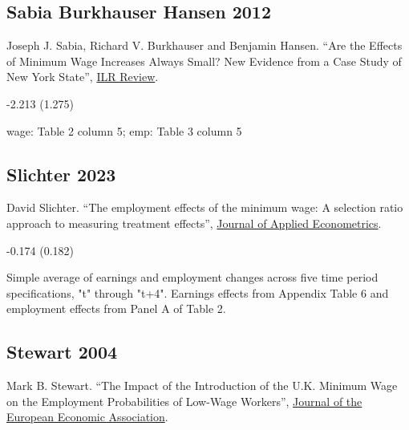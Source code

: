 \subsection*{Sabia Burkhauser Hansen 2012}
\vspace{-0.7em}

\noindent Joseph J. Sabia, Richard V. Burkhauser and Benjamin Hansen. ``Are the Effects of Minimum Wage Increases Always Small? New Evidence from a Case Study of New York State'', \href{https://doi.org/10.1177/001979391206500207}{ILR Review}.

\vspace{0.7em}

 -2.213 (1.275)

\vspace{0.7em}

 wage: Table 2 column 5; emp: Table 3 column 5

\subsection*{Slichter 2023}
\vspace{-0.7em}

\noindent David Slichter. ``The employment effects of the minimum wage: A selection ratio approach to measuring treatment effects'', \href{https://doi.org/10.1002/jae.2954}{Journal of Applied Econometrics}.

\vspace{0.7em}

 -0.174 (0.182)

\vspace{0.7em}

 Simple average of earnings and employment changes across five time period specifications, "t" through "t+4". Earnings effects from Appendix Table 6 and employment effects from Panel A of Table 2.

\subsection*{Stewart 2004}
\vspace{-0.7em}

\noindent Mark B. Stewart. ``The Impact of the Introduction of the U.K. Minimum Wage on the Employment Probabilities of Low-Wage Workers'', \href{https://doi.org/10.1162/154247604323015481}{Journal of the European Economic Association}.

